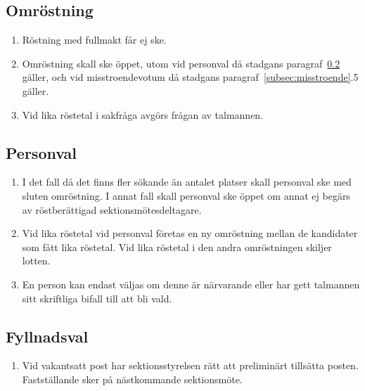 \documentclass[11pt,a4paper]{article}
\begin{document}
\subsection{Omröstning}

\begin{enumerate}[\thesubsection.1]

  \item Röstning med fullmakt får ej ske.

  \item Omröstning skall ske öppet, utom vid personval då stadgans
  paragraf~\ref{subsec:personval} gäller, och vid misstroendevotum då stadgans paragraf~\ref{subsec:misstroende}.5 gäller.

  \item Vid lika röstetal i sakfråga avgörs frågan av talmannen.

\end{enumerate}

\subsection{Personval}\label{subsec:personval}

\begin{enumerate}[\thesubsection.1]
  
  \item I det fall då det finns fler sökande än antalet platser skall personval ske med sluten omröstning. I annat fall skall personval ske öppet om annat ej begärs av röstberättigad sektionsmötesdeltagare.
  
  \item Vid lika röstetal vid personval företas en ny omröstning mellan de kandidater som fått lika röstetal. Vid lika röstetal i den andra omröstningen skiljer lotten.
  
  \item En person kan endast väljas om denne är närvarande eller har gett talmannen sitt skriftliga bifall till att bli vald.

\end{enumerate}

\subsection{Fyllnadsval}

\begin{enumerate}[\thesubsection.1]

  \item Vid vakantsatt post har sektions\-styr\-elsen rätt att preliminärt tillsätta posten. Fastställande sker på näst\-komm\-ande sektionsmöte.

\end{enumerate}
\end{document}
